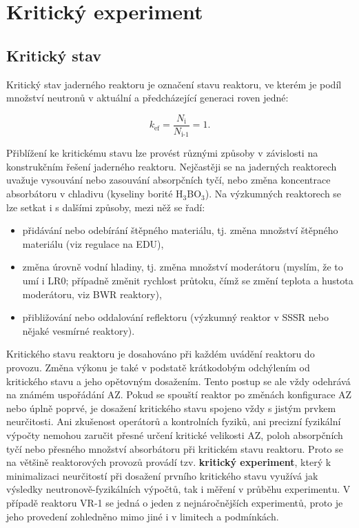 \section[Kritický experiment]{Kritický experiment}

\subsection{Kritický stav}

Kritický stav jaderného reaktoru je označení stavu reaktoru, ve kterém je podíl množství neutronů v aktuální a předcházející generaci roven jedné: 

\begin{equation}
    \boxed{ k_\text{ef} = \frac{N_\text{i}}{N_\text{i-1}} = 1.}
\end{equation}

Přiblížení ke kritickému stavu lze provést různými způsoby v závislosti na konstrukčním řešení jaderného reaktoru. Nejčastěji se na jaderných reaktorech uvažuje vysouvání nebo zasouvání absorpčních tyčí, nebo změna koncentrace absorbátoru v chladivu (kyseliny borité H$_3$BO$_3$). Na výzkumných reaktorech se lze setkat i s dalšími způsoby, mezi něž se řadí:

\begin{itemize}%
    \item přidávání nebo odebírání štěpného materiálu, tj. změna množství štěpného materiálu (viz regulace na EDU),
    \item změna úrovně vodní hladiny, tj. změna množství moderátoru (myslím, že to umí i LR0; případně změnit rychlost průtoku, čímž se změní teplota a hustota moderátoru, viz BWR reaktory),
    \item přibližování nebo oddalování reflektoru (výzkumný reaktor v SSSR nebo nějaké vesmírné reaktory).
\end{itemize}

Kritického stavu reaktoru je dosahováno při každém uvádění reaktoru do provozu. Změna výkonu je také v podstatě krátkodobým odchýlením od kritického stavu a jeho opětovným dosažením. Tento postup se ale vždy odehrává na známém uspořádání AZ. Pokud se spouští reaktor po změnách konfigurace AZ nebo úplně poprvé, je dosažení kritického stavu spojeno vždy s jistým prvkem neurčitosti. Ani zkušenost operátorů a kontrolních fyziků, ani precizní fyzikální výpočty nemohou zaručit přesné určení kritické velikosti AZ, poloh absorpčních tyčí nebo přesného množství absorbátoru při kritickém stavu reaktoru. Proto se na většině reaktorových provozů provádí tzv. \textbf{kritický experiment}, který k minimalizaci neurčitostí při dosažení prvního kritického stavu využívá jak výsledky neutronově-fyzikálních výpočtů, tak i měření v průběhu experimentu. V případě reaktoru VR-1 se jedná o jeden z nejnáročnějších experimentů, proto je jeho provedení zohledněno mimo jiné i v limitech a podmínkách. 

